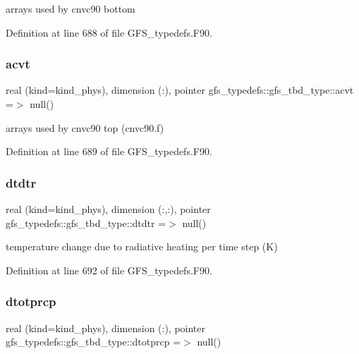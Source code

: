 arrays used by cnvc90 bottom 



Definition at line 688 of file G\+F\+S\+\_\+typedefs.\+F90.

\mbox{\label{structgfs__typedefs_1_1gfs__tbd__type_a8536f12d4967329aea2f69895407f3bb}} 
\subsubsection{acvt}
{\footnotesize\ttfamily real (kind=kind\+\_\+phys), dimension     (\+:), pointer gfs\+\_\+typedefs\+::gfs\+\_\+tbd\+\_\+type\+::acvt =$>$ null()}



arrays used by cnvc90 top (cnvc90.\+f) 



Definition at line 689 of file G\+F\+S\+\_\+typedefs.\+F90.

\mbox{\label{structgfs__typedefs_1_1gfs__tbd__type_a6cdc51c9a3cc1379c7183df5d89bc93a}} 
\subsubsection{dtdtr}
{\footnotesize\ttfamily real (kind=kind\+\_\+phys), dimension     (\+:,\+:), pointer gfs\+\_\+typedefs\+::gfs\+\_\+tbd\+\_\+type\+::dtdtr =$>$ null()}



temperature change due to radiative heating per time step (K) 



Definition at line 692 of file G\+F\+S\+\_\+typedefs.\+F90.

\mbox{\label{structgfs__typedefs_1_1gfs__tbd__type_aefaec3a546da78f04c05c337673a7eca}} 
\subsubsection{dtotprcp}
{\footnotesize\ttfamily real (kind=kind\+\_\+phys), dimension  (\+:), pointer gfs\+\_\+typedefs\+::gfs\+\_\+tbd\+\_\+type\+::dtotprcp =$>$ null()}



